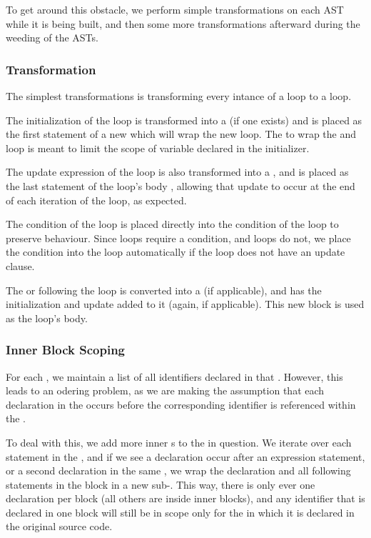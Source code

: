 \documentclass[pdftex,11pt,a4paper]{article}
\begin{document}
To get around this obstacle, we perform simple transformations on each
AST while it is being built, and then some more transformations
afterward during the weeding of the ASTs.


\subsubsection{ Transformation}

The simplest transformations is transforming every intance of a
 loop to a  loop.

The initialization of the  loop is transformed into a 
(if one exists) and is placed as the first statement of a new
 which will wrap the new  loop. The 
to wrap the  and loop is meant to limit the scope of
variable declared in the  initializer.

The update expression of the  loop is also transformed into a
, and is placed as the last statement of the
 loop's body , allowing that update to occur at the
end of each iteration of the loop, as expected.

The condition of the  loop is placed directly into the condition of
the  loop to preserve behaviour. Since  loops require a
condition, and  loops do not, we place the  condition into
the  loop automatically if the  loop does not have an
update clause.

The  or  following the  loop is converted
into a  (if applicable), and has the initialization and update
added to it (again, if applicable). This new block is used as the 
loop's body.

\subsubsection{Inner Block Scoping}

For each , we maintain a list of all identifiers declared in
that . However, this leads to an odering problem, as we are making
the assumption that each declaration in the  occurs before the
corresponding identifier is referenced within the .

To deal with this, we add more inner s to the  in
question. We iterate over each statement in the , and if we see a
declaration occur after an expression statement, or a second
declaration in the same , we wrap the declaration and all
following statements in the block in a new sub-. This way,
there is only ever one declaration per block (all others are inside
inner blocks), and any identifier that is declared in one block will
still be in scope only for the  in which it is declared in
the original source code.
\end{document}
